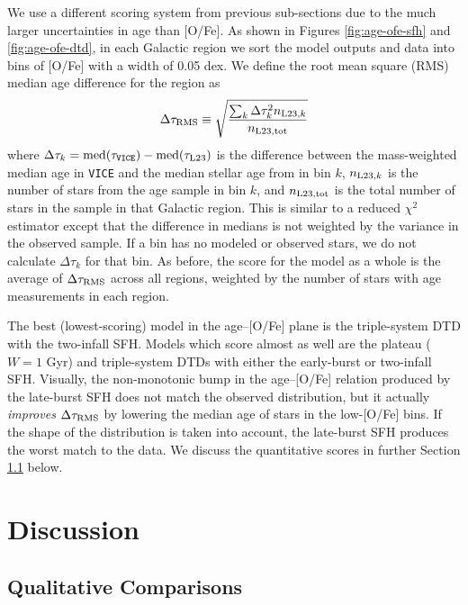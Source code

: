 \documentclass[twocolumn,twocolappendix]{aastex631}
\newcommand{\vice}{{\tt VICE}\xspace}
\begin{document}
We use a different scoring system from previous sub-sections due to the much larger uncertainties in age than [O/Fe]. As shown in Figures \ref{fig:age-ofe-sfh} and \ref{fig:age-ofe-dtd}, in each Galactic region we sort the model outputs and data into bins of [O/Fe] with a width of 0.05 dex. We define the root mean square (RMS) median age difference for the region as
\begin{equation}
    \Delta\tau_{\rm RMS} \equiv \sqrt{\frac{\sum_k \Delta\tau_k^2 n_{{\rm L23},k}}{n_{\rm L23,tot}}}
    \label{eq:age-ofe-score}
\end{equation}
where $\Delta\tau_k=\rm{med}(\tau_{\rm \vice})-\rm{med}(\tau_{\rm L23})$ is the difference between the mass-weighted median age in \vice and the median stellar age from  in bin $k$, $n_{{\rm L23},k}$ is the number of stars from the  age sample in bin $k$, and $n_{\rm L23,tot}$ is the total number of stars in the sample in that Galactic region. This is similar to a reduced $\chi^2$ estimator except that the difference in medians is not weighted by the variance in the observed sample. If a bin has no modeled or observed stars, we do not calculate $\Delta \tau_k$ for that bin. As before, the score for the model as a whole is the average of $\Delta \tau_{\rm RMS}$ across all regions, weighted by the number of stars with age measurements in each region.

The best (lowest-scoring) model in the age--[O/Fe] plane is the triple-system DTD with the two-infall SFH. Models which score almost as well are the plateau ($W=1$ Gyr) and triple-system DTDs with either the early-burst or two-infall SFH. Visually, the non-monotonic bump in the age--[O/Fe] relation produced by the late-burst SFH does not match the observed distribution, but it actually {\it improves} $\Delta \tau_{\rm RMS}$ by lowering the median age of stars in the low-[O/Fe] bins. If the shape of the distribution is taken into account, the late-burst SFH produces the worst match to the data.
We discuss the quantitative scores in further Section \ref{sec:discussion-scores} below.

\section{Discussion}
\label{sec:discussion}

\subsection{Qualitative Comparisons}
\label{sec:discussion-scores}
\end{document}
